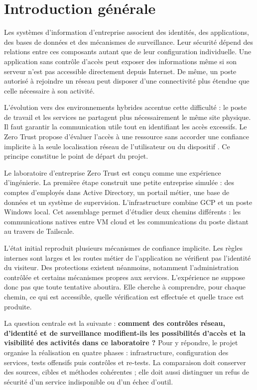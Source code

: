 \documentclass[a4paper,12pt]{report}
\begin{document}
\chapter*{Introduction générale}
Les systèmes d'information d'entreprise associent des identités, des applications, des bases de données et des mécanismes de surveillance. Leur sécurité dépend des relations entre ces composants autant que de leur configuration individuelle. Une application sans contrôle d'accès peut exposer des informations même si son serveur n'est pas accessible directement depuis Internet. De même, un poste autorisé à rejoindre un réseau peut disposer d'une connectivité plus étendue que celle nécessaire à son activité.

L'évolution vers des environnements hybrides accentue cette difficulté : le poste de travail et les services ne partagent plus nécessairement le même site physique. Il faut garantir la communication utile tout en identifiant les accès excessifs. Le Zero Trust propose d'évaluer l'accès à une ressource sans accorder une confiance implicite à la seule localisation réseau de l'utilisateur ou du dispositif \cite{nist}. Ce principe constitue le point de départ du projet.

Le laboratoire d'entreprise Zero Trust est conçu comme une expérience d'ingénierie. La première étape construit une petite entreprise simulée : des comptes d'employés dans Active Directory, un portail métier, une base de données et un système de supervision. L'infrastructure combine GCP et un poste Windows local. Cet assemblage permet d'étudier deux chemins différents : les communications natives entre VM cloud et les communications du poste distant au travers de Tailscale.

L'état initial reproduit plusieurs mécanismes de confiance implicite. Les règles internes sont larges et les routes métier de l'application ne vérifient pas l'identité du visiteur. Des protections existent néanmoins, notamment l'administration contrôlée et certains mécanismes propres aux services. L'expérience ne suppose donc pas que toute tentative aboutira. Elle cherche à comprendre, pour chaque chemin, ce qui est accessible, quelle vérification est effectuée et quelle trace est produite.

La question centrale est la suivante : \textbf{comment des contrôles réseau, d'identité et de surveillance modifient-ils les possibilités d'accès et la visibilité des activités dans ce laboratoire ?} Pour y répondre, le projet organise la réalisation en quatre phases : infrastructure, configuration des services, tests offensifs puis contrôles et re-tests. La comparaison doit conserver des sources, cibles et méthodes cohérentes ; elle doit aussi distinguer un refus de sécurité d'un service indisponible ou d'un échec d'outil.
\end{document}
